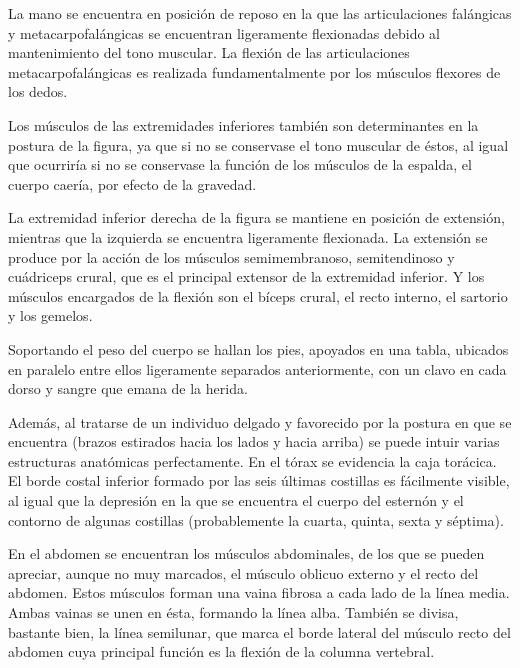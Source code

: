 La mano se encuentra en posición de reposo en la que las articulaciones falángicas y metacarpofalángicas se encuentran ligeramente flexionadas debido al mantenimiento del tono muscular. La flexión de las articulaciones metacarpofalángicas es realizada fundamentalmente por los músculos flexores de los dedos.

Los músculos de las extremidades inferiores también son determinantes en la postura de la figura, ya que si no se conservase el tono muscular de éstos, al igual que ocurriría si no se conservase la función de los músculos de la espalda, el cuerpo caería, por efecto de la gravedad.

La extremidad inferior derecha de la figura se mantiene en posición de extensión, mientras que la izquierda se encuentra ligeramente flexionada. La extensión se produce por la acción de los músculos semimembranoso, semitendinoso y cuádriceps crural, que es el principal extensor de la extremidad inferior. Y los músculos encargados de la flexión son el bíceps crural, el recto interno, el sartorio y los gemelos.

Soportando el peso del cuerpo se hallan los pies, apoyados en una tabla, ubicados en paralelo entre ellos ligeramente separados anteriormente, con un clavo en cada dorso y sangre que emana de la herida.

Además, al tratarse de un individuo delgado y favorecido por la postura en que se encuentra (brazos estirados hacia los lados y hacia arriba) se puede intuir varias estructuras anatómicas perfectamente. En el tórax se evidencia la caja torácica. El borde costal inferior formado por las seis últimas costillas es fácilmente visible, al igual que la depresión en la que se encuentra el cuerpo del esternón y el contorno de algunas costillas (probablemente la cuarta, quinta, sexta y séptima).

En el abdomen se encuentran los músculos abdominales, de los que se pueden apreciar, aunque no muy marcados, el músculo oblicuo externo y el recto del abdomen. Estos músculos forman una vaina fibrosa a cada lado de la línea media. Ambas vainas se unen en ésta, formando la línea alba. También se divisa, bastante bien, la línea semilunar, que marca el borde lateral del músculo recto del abdomen cuya principal función es la flexión de la columna vertebral.


